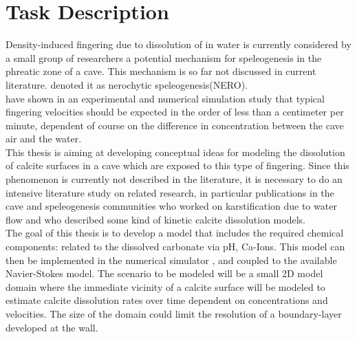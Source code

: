 \chapter*{Task Description}
\thispagestyle{empty}

Density-induced fingering due to dissolution of  in water is currently considered by 
a small group of researchers a potential mechanism for speleogenesis in the phreatic zone of a cave. 
This mechanism is so far not discussed in current literature. \citet{Scherzer2017} denoted it as 
nerochytic speleogenesis(NERO).\\
\citet{Class2020} have shown in an experimental and numerical simulation study that typical fingering 
velocities should be expected in the order of less than a centimeter per minute, dependent of course on 
the difference in  concentration between the cave air and the water. \\

This thesis is aiming at developing conceptual ideas for modeling the dissolution of calcite surfaces in 
a cave which are exposed to this type of fingering. Since this phenomenon is currently not described in 
the literature, it is necessary to do an intensive literature study on related research, in particular 
publications in the cave and speleogenesis communities who worked on karstification due to water flow and 
who described some kind of kinetic
calcite dissolution models.\\

The goal of this thesis is to develop a model that includes the required chemical components:  related to 
the dissolved carbonate via pH, Ca-Ions. This model can then be implemented in the 
numerical simulator \DuMuX \citep{Koch2020}, and coupled to the available Navier-Stokes model. 
The scenario to be modeled will be a small 2D model domain where the immediate vicinity of a calcite 
surface will be modeled to estimate calcite dissolution rates over time dependent on  
concentrations and velocities. The size of the domain could limit the resolution of a boundary-layer developed at the wall.

\endinput
